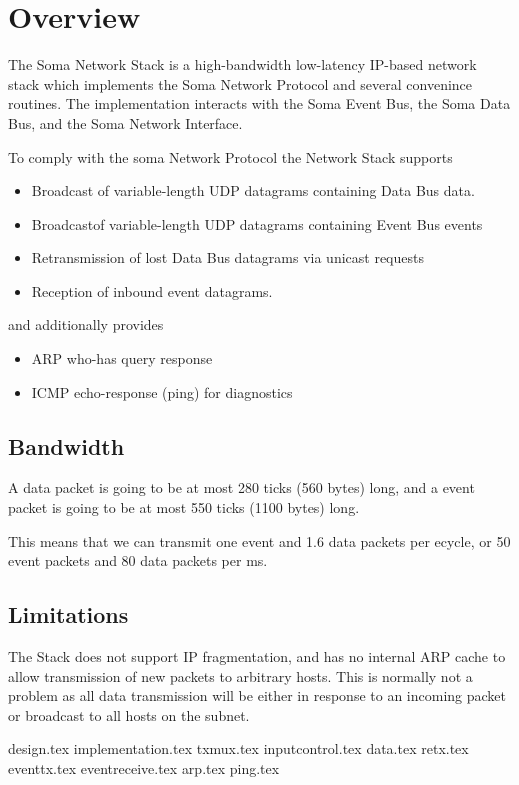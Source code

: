 \section{Overview}

The Soma Network Stack is a high-bandwidth low-latency IP-based
network stack which implements the Soma Network Protocol and several
convenince routines. The implementation interacts with the Soma Event
Bus, the Soma Data Bus, and the Soma Network Interface.

To comply with the soma Network Protocol the Network Stack supports 
\begin{itemize}
\item Broadcast of variable-length UDP datagrams containing Data Bus data. 
\item Broadcastof variable-length UDP datagrams containing Event Bus events
\item Retransmission of lost Data Bus datagrams via unicast requests 
\item Reception of inbound event datagrams. 
\end{itemize}

and additionally provides 
\begin{itemize}
\item ARP who-has query response
\item ICMP echo-response (ping) for diagnostics
\end{itemize}

\subsection{Bandwidth}
A data packet is going to be at most 280 ticks (560 bytes) long, and a
event packet is going to be at most 550 ticks (1100 bytes) long.

This means that we can transmit one event and 1.6 data packets per
ecycle, or 50 event packets and 80 data packets per ms.


\subsection{Limitations}
The Stack does not support IP fragmentation, and has no internal ARP
cache to allow transmission of new packets to arbitrary hosts. This is
normally not a problem as all data transmission will be either in
response to an incoming packet or broadcast to all hosts on the
subnet.

{design.tex}
{implementation.tex}
{txmux.tex}
{inputcontrol.tex}
{data.tex}
{retx.tex}
{eventtx.tex}
{eventreceive.tex}
{arp.tex}
{ping.tex}

